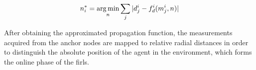     \begin{equation}
      n^*_i = \operatorname*{arg\,min}_n \sum_j |d^i_j - f^i_d(m^i_j, n)|
    \end{equation}

    After obtaining the approximated propagation function, the measurements acquired from the anchor nodes are mapped to relative radial distances in order to distinguish the absolute position of the agent in the environment, which forms the online phase of the \gls{firl}s.
